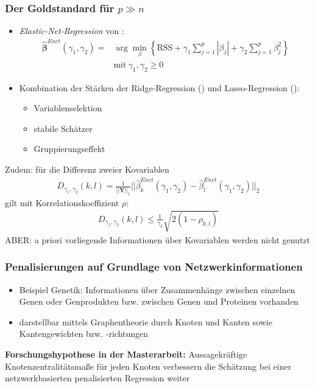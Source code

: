 \documentclass{beamer}
\begin{document}
\begin{frame}
\frametitle{Der \glqq Goldstandard{\grqq} für $p \gg n$}
	\begin{itemize}
	\item \textit{Elastic-Net-Regression} von \cite{zou_regularization_2005}:
	\begin{align*}
	\boldsymbol{\hat{\beta}}^{Enet}(\gamma_1, \gamma_2)=&\arg \displaystyle\min_{\beta} \left\lbrace \text{RSS}  + \gamma_1 \sum_{j=1}^{p}|\beta_j| + \gamma_2 \sum_{j=1}^{p}\beta_j^2 \right\rbrace\\ &\text{mit} \ \gamma_1,\gamma_2 \ge 0
	\end{align*}
	\item Kombination der Stärken der Ridge-Regression (\cite{hoerl_ridge_1970}) und Lasso-Regression (\cite{tibshirani96regression}):
	\begin{itemize}
	\item Variablenselektion 
	\item stabile Schätzer
	\item Gruppierungseffekt
	\end{itemize}	
	\end{itemize}
\end{frame}

\begin{frame}
	Zudem: für die Differenz zweier Kovariablen
		\begin{align*}
		D_{\gamma_1,\gamma_2}(k,l)=\frac{1}{||\mathbf{Y}||_1}||\hat{\beta}_k^{Enet}(\gamma_1,\gamma_2)-\hat{\beta}_l^{Enet}(\gamma_1,\gamma_2)||_2
		\end{align*}
		gilt mit Korrelationskoeffizient $\rho$:
		\begin{align*}
		D_{\gamma_1,\gamma_2}(k,l) \leq \frac{1}{\gamma_2}\sqrt{2(1-\rho_{k,l})}
		\end{align*}
		ABER: a priori vorliegende Informationen über Kovariablen werden nicht genutzt
\end{frame}


\begin{frame}
\frametitle{Penalisierungen auf Grundlage von Netzwerkinformationen}
	\begin{itemize}
	\item  Beispiel Genetik: Informationen über Zusammenhänge zwischen einzelnen Genen oder Genprodukten bzw. zwischen Genen und Proteinen vorhanden
	\item darstellbar mittels Graphentheorie durch Knoten und Kanten sowie Kantengewichten bzw. -richtungen
	\end{itemize}
	\textbf{Forschungshypothese in der Masterarbeit:} Aussagekräftige Knotenzentralitätsmaße für jeden Knoten verbessern die Schätzung bei einer netzwerkbasierten penalisierten Regression weiter
\end{frame}
\end{document}

